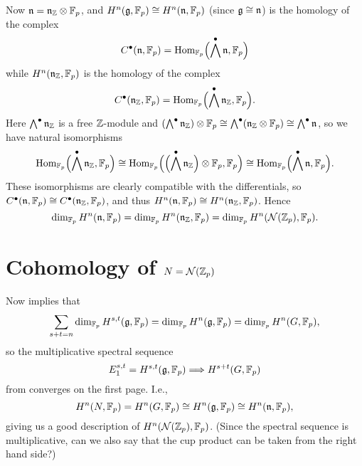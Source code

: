 Now $\mathfrak{n} = \mathfrak{n}_{\mathbb{Z}} \otimes \mathbb{F}_p$, and $H^n(\mathfrak{g},\mathbb{F}_p) \cong H^{n}(\mathfrak{n},\mathbb{F}_p)$ (since $\mathfrak{g} \cong \mathfrak{n}$) is the homology of the complex
\begin{equation*}
  C^\bullet(\mathfrak{n},\mathbb{F}_p) = \operatorname{Hom}_{\mathbb{F}_p}\Bigl( \bigwedge^\bullet \mathfrak{n},\mathbb{F}_p \Bigr)
\end{equation*}
while $H^{n}(\mathfrak{n}_{\mathbb{Z}},\mathbb{F}_p)$ is the homology of the complex
\begin{equation*}
  C^\bullet(\mathfrak{n}_{\mathbb{Z}},\mathbb{F}_p) = \operatorname{Hom}_{\mathbb{F}_p}\Bigl( \bigwedge^\bullet \mathfrak{n}_{\mathbb{Z}},\mathbb{F}_p \Bigr).
\end{equation*}
Here $\bigwedge^\bullet \mathfrak{n}_{\mathbb{Z}}$ is a free $\mathbb{Z}$-module and $(\bigwedge^\bullet \mathfrak{n}_{\mathbb{Z}}) \otimes \mathbb{F}_p \cong \bigwedge^\bullet (\mathfrak{n}_{\mathbb{Z}} \otimes \mathbb{F}_p) \cong \bigwedge^\bullet \mathfrak{n}$, so we have natural isomorphisms
\begin{equation*}
  \operatorname{Hom}_{\mathbb{F}_p}\Bigl( \bigwedge^\bullet \mathfrak{n}_{\mathbb{Z}},\mathbb{F}_p \Bigr) \cong \operatorname{Hom}_{\mathbb{F}_p}\Bigl( \Bigl( \bigwedge^\bullet \mathfrak{n}_{\mathbb{Z}} \Bigr) \otimes \mathbb{F}_p, \mathbb{F}_p \Bigr) \cong \operatorname{Hom}_{\mathbb{F}_p}\Bigl( \bigwedge^\bullet \mathfrak{n},\mathbb{F}_p \Bigr).
\end{equation*}
These isomorphisms are clearly compatible with the differentials, so $C^\bullet(\mathfrak{n},\mathbb{F}_p) \cong C^\bullet(\mathfrak{n}_{\mathbb{Z}},\mathbb{F}_p)$, and thus $H^n(\mathfrak{n},\mathbb{F}_p) \cong H^n(\mathfrak{n}_{\mathbb{Z}},\mathbb{F}_p)$. Hence
\begin{equation*}
  \dim_{\mathbb{F}_p} H^n(\mathfrak{n},\mathbb{F}_p) = \dim_{\mathbb{F}_p} H^n(\mathfrak{n}_{\mathbb{Z}},\mathbb{F}_p) = \dim_{\mathbb{F}_p} H^{n}(\mathcal{N}(\mathbb{Z}_p),\mathbb{F}_p).
\end{equation*}

\section{Cohomology of \texorpdfstring{$N=\mathcal{N}(\mathbb{Z}_p)$}{N=NZp}}

Now  implies that
\begin{equation*}
  \sum_{s+t = n} \dim_{\mathbb{F}_p} H^{s,t}(\mathfrak{g},\mathbb{F}_p) = \dim_{\mathbb{F}_p} H^n(\mathfrak{g},\mathbb{F}_p) = \dim_{\mathbb{F}_p} H^n(G,\mathbb{F}_p),
\end{equation*}
so the multiplicative spectral sequence
\begin{equation*}
  E_{1}^{s,t} = H^{s,t}(\mathfrak{g},\mathbb{F}_p) \Longrightarrow H^{s+t}(G,\mathbb{F}_p)
\end{equation*}
from  converges on the first page. I.e.,
\begin{equation*}
  H^n(N,\mathbb{F}_p) = H^n(G,\mathbb{F}_p) \cong H^n(\mathfrak{g},\mathbb{F}_p) \cong H^n(\mathfrak{n},\mathbb{F}_p),
\end{equation*}
giving us a good description of $H^n(\mathcal{N}(\mathbb{Z}_p),\mathbb{F}_p)$. (Since the spectral sequence is multiplicative, can we also say that the cup product can be taken from the right hand side?)

